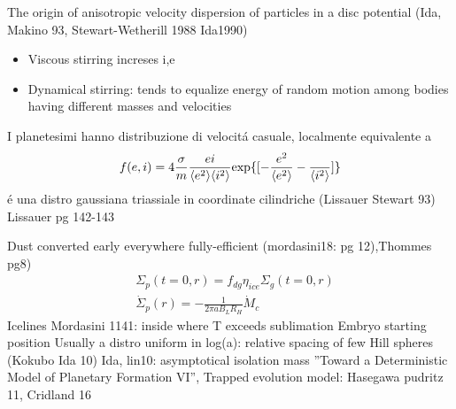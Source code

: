 \begin{workout}
	The origin of anisotropic velocity dispersion of particles in a disc potential (Ida, Makino 93, Stewart-Wetherill 1988 Ida1990)
\end{workout}

\begin{workout}
	\begin{itemize}
		\item Viscous stirring increses i,e
		\item Dynamical stirring: tends to equalize energy of random motion among bodies having different masses and velocities
	\end{itemize}
\end{workout}

\begin{workout}
	I planetesimi hanno distribuzione di velocit\'a casuale, localmente equivalente a
	\begin{equation}
	f(e,i)=4\frac{\sigma}{m}\frac{ei}{\langle e^2 \rangle\langle i^2 \rangle}\text{exp}\{[-\frac{e^2}{\langle e^2 \rangle}-\frac{}{\langle i^2 \rangle}]\}
	\end{equation}
	\'e una distro gaussiana triassiale in coordinate cilindriche (Lissauer Stewart 93)
	Lissauer pg 142-143
\end{workout}

\begin{workout}
	
\end{workout}


\begin{workout}
	Dust converted early everywhere fully-efficient (mordasini18: pg 12),Thommes pg8)
	\begin{align*}
		&\Sigma_p(t=0,r)=f_{dg}\eta_{ice}\Sigma_g(t=0,r)\\
		&\dot{\Sigma}_p(r)=-\frac{1}{2\pi aB_LR_H}\dot{M}_c
	\end{align*}
	Icelines Mordasini 1141: inside where T exceeds sublimation
	{Embryo starting position}
	Usually a distro uniform in log(a): relative spacing of few Hill spheres (Kokubo Ida 10)
	Ida, lin10: asymptotical isolation mass ''Toward a Deterministic Model of Planetary Formation VI'',
	Trapped evolution model: Hasegawa pudritz 11, Cridland 16
\end{workout}


